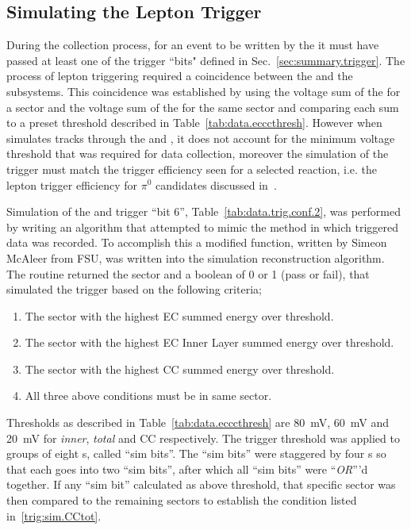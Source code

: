 \subsection{Simulating the Lepton Trigger}\label{sec:analysis.accept.trigger}
During the collection process, for an event to be written by the  it must have passed at least one of the trigger ``bits" defined in Sec.~\ref{sec:summary.trigger}. The process of lepton triggering required a coincidence between the  and the  subsystems. This coincidence was established by using the voltage sum of the  for a sector and the voltage sum of the  for the same sector and comparing each sum to a preset threshold described in Table~\ref{tab:data.ecccthresh}. However when  simulates tracks through the  and , it does not account for the minimum voltage threshold that was required for data collection, moreover the simulation of the trigger must match the trigger efficiency seen for a selected reaction, i.e. the lepton trigger efficiency for $\pi^0$ candidates discussed in~\cite{clas.thesis.kunkel}.

Simulation of the  and  trigger ``bit 6'', Table~\ref{tab:data.trig.conf.2}, was performed by writing an algorithm that attempted to mimic the method in which triggered data was recorded. To accomplish this a modified function, written by Simeon McAleer from FSU, was written into the simulation reconstruction algorithm. The routine returned the sector and a boolean of 0 or 1 (pass or fail), that simulated the trigger based on the following criteria;
\begin{enumerate}\label{trig:sim.all}
\item The sector with the highest EC summed energy over threshold. \label{trig:sim.ECtot} 
\item The sector with the highest EC Inner Layer summed energy over threshold. \label{trig:sim.ECinner} 
\item The sector with the highest CC summed energy over threshold. \label{trig:sim.CCtot} 
\item All three above conditions must be in same sector.
\end{enumerate}
Thresholds as described in Table~\ref{tab:data.ecccthresh} are 80~mV, 60~mV and 20~mV for  \emph{inner}, \emph{total} and CC respectively. The  trigger threshold was applied to groups of eight  s, called ``sim bits''. The ``sim bits'' were staggered by four s so that each  goes into two ``sim bits'', after which all ``sim bits'' were ``\emph{OR}'''d together. If any ``sim bit'' calculated as above threshold, that specific sector was then compared to the remaining sectors to establish the condition listed in~\ref{trig:sim.CCtot}.

